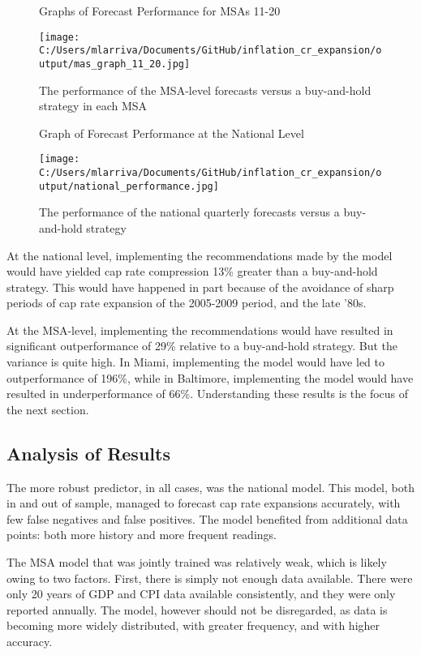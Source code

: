 \begin{figure}[H]
\hspace*{-0.25in}
\caption*{Graphs of Forecast Performance for MSAs 11-20}
\texttt{[image: C:/Users/mlarriva/Documents/GitHub/inflation\_cr\_expansion/output/mas\_graph\_11\_20.jpg]}
\caption{The performance of the MSA-level forecasts versus a buy-and-hold strategy in each MSA}
\end{figure}

\begin{figure}[H]
\caption*{Graph of Forecast Performance at the National Level}
\texttt{[image: C:/Users/mlarriva/Documents/GitHub/inflation\_cr\_expansion/output/national\_performance.jpg]}
\caption{The performance of the national quarterly forecasts versus a buy-and-hold strategy}
\end{figure}

At the national level, implementing the recommendations made by the model would have yielded cap rate compression 13\% greater than a buy-and-hold strategy. This would have happened in part because of the avoidance of sharp periods of cap rate expansion of the 2005-2009 period, and the late '80s.

At the MSA-level, implementing the recommendations would have resulted in significant outperformance of 29\% relative to a buy-and-hold strategy. But the variance is quite high. In Miami, implementing the model would have led to outperformance of 196\%, while in Baltimore, implementing the model would have resulted in underperformance of 66\%. Understanding these results is the  focus of the next section.

\pagebreak

\subsection{Analysis of Results}

The more robust predictor, in all cases, was the national model. This model, both in and out of sample, managed to forecast cap rate expansions accurately, with few false negatives and false positives. The model benefited from additional data points: both more history and more frequent readings. 

The MSA model that was jointly trained was relatively weak, which is likely owing to two factors. First, there is simply not enough data available. There were only 20 years of GDP and CPI data available consistently, and they were only reported annually. The model, however should not be disregarded, as data is becoming more widely distributed, with greater frequency, and with higher accuracy.

